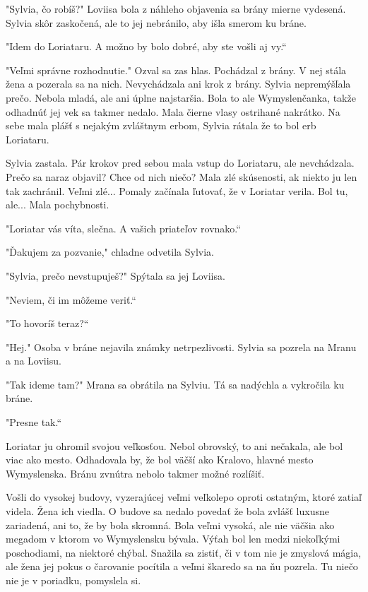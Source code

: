 \documentclass{book}
\begin{document}
"$ $Sylvia, čo robíš?"$ $ Loviisa bola z náhleho objavenia sa brány mierne vydesená. Sylvia skôr zaskočená, ale to jej nebránilo, aby išla smerom ku bráne.

"$ $Idem do Loriataru. A možno by bolo dobré, aby ste vošli aj vy.“

"$ $Veľmi správne rozhodnutie."$ $ Ozval sa zas hlas. Pochádzal z brány. V nej stála žena a pozerala sa na nich. Nevychádzala ani krok z brány. Sylvia nepremýšľala prečo. Nebola mladá, ale ani úplne najstaršia. Bola to ale Wymyslenčanka, takže odhadnúť jej vek sa takmer nedalo. Mala čierne vlasy ostrihané nakrátko. Na sebe mala plášť s nejakým zvláštnym erbom, Sylvia rátala že to bol erb Loriataru.

Sylvia zastala. Pár krokov pred sebou mala vstup do Loriataru, ale nevchádzala. Prečo sa naraz objavil? Chce od nich niečo? Mala zlé skúsenosti, ak niekto ju len tak zachránil. Veľmi zlé... Pomaly začínala ľutovať, že v Loriatar verila. Bol tu, ale... Mala pochybnosti.

"$ $Loriatar vás víta, slečna. A vašich priateľov rovnako.“

"$ $Ďakujem za pozvanie,"$ $ chladne odvetila Sylvia.

"$ $Sylvia, prečo nevstupuješ?"$ $ Spýtala sa jej Loviisa.

"$ $Neviem, či im môžeme veriť.“

"$ $To hovoríš teraz?“

"$ $Hej."$ $ Osoba v bráne nejavila známky netrpezlivosti. Sylvia sa pozrela na Mranu a na Loviisu.

"$ $Tak ideme tam?"$ $ Mrana sa obrátila na Sylviu. Tá sa nadýchla a vykročila ku bráne.

"$ $Presne tak.“

Loriatar ju ohromil svojou veľkosťou. Nebol obrovský, to ani nečakala, ale bol viac ako mesto. Odhadovala by, že bol väčší ako Kralovo, hlavné mesto Wymyslenska. Bránu zvnútra nebolo takmer možné rozlíšiť.

Vošli do vysokej budovy, vyzerajúcej veľmi veľkolepo oproti ostatným, ktoré zatiaľ videla. Žena ich viedla. O budove sa nedalo povedať že bola zvlášť luxusne zariadená, ani to, že by bola skromná. Bola veľmi vysoká, ale nie väčšia ako megadom v ktorom vo Wymyslensku bývala. Výťah bol len medzi niekoľkými poschodiami, na niektoré chýbal. Snažila sa zistiť, či v tom nie je zmyslová mágia, ale žena jej pokus o čarovanie pocítila a veľmi škaredo sa na ňu pozrela. Tu niečo nie je v poriadku, pomyslela si.
\end{document}
